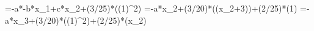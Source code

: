 =-a*-b*x_1+c*x_2+(3/25)*\sin((1)^2)
=-a*x_2+(3/20)*\sin((x_2+3))+(2/25)*\cos(1)
=-a*x_3+(3/20)*\sin((1)^2)+(2/25)*\cos(x_2)
